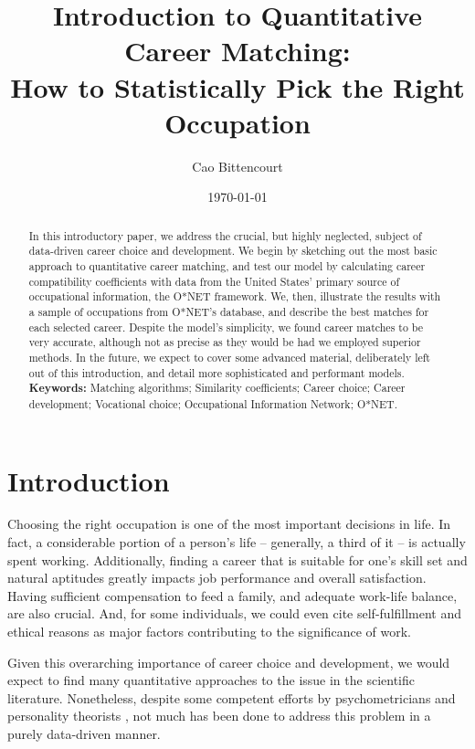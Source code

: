 \documentclass{article}
\title{
    Introduction to Quantitative Career Matching:\\
    How to Statistically Pick the Right Occupation
}
\author{Cao Bittencourt}
\date{\today}
\begin{document}
\maketitle

\newpage

\begin{abstract}
    \noindent
    In this introductory paper, we address the crucial, but highly neglected, subject of data-driven career choice and development. We begin by sketching out the most basic approach to quantitative career matching, and test our model by calculating career compatibility coefficients with data from the United States' primary source of occupational information, the O*NET framework. We, then, illustrate the results with a sample of occupations from O*NET's database, and describe the best matches for each selected career. Despite the model's simplicity, we found career matches to be very accurate, although not as precise as they would be had we employed superior methods. In the future, we expect to cover some advanced material, deliberately left out of this introduction, and detail more sophisticated and performant models.\\

    \noindent
    \textbf{Keywords:} Matching algorithms; Similarity coefficients; Career choice; Career development; Vocational choice; Occupational Information Network; O*NET.
\end{abstract}

\newpage
\tableofcontents

\newpage
\listoftables

\newpage
\section{Introduction}
Choosing the right occupation is one of the most important decisions in life.
In fact, a considerable portion of a person's life -- generally, a third of it
-- is actually spent working. Additionally, finding a career that is suitable
for one's skill set and natural aptitudes greatly impacts job performance and
overall satisfaction. Having sufficient compensation to feed a family, and
adequate work-life balance, are also crucial. And, for some individuals, we
could even cite self-fulfillment and ethical reasons as major factors
contributing to the significance of work.

Given this overarching importance of career choice and development, we would
expect to find many quantitative approaches to the issue in the scientific
literature. Nonetheless, despite some competent efforts by psychometricians and
personality theorists \parencites[e.g.][]{holland1959theory,
    holland1997making}{schein1978careerdynamics, schein1993careeranchors}, not much
has been done to address this problem in a purely data-driven manner.
\end{document}
